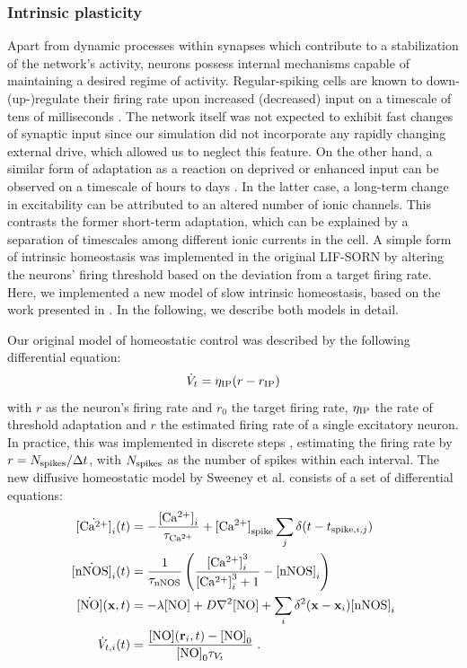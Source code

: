 \documentclass[10pt,letterpaper]{article}
\begin{document}
\subsubsection*{Intrinsic plasticity}
Apart from dynamic processes within synapses which contribute to a stabilization of the network's activity, neurons possess internal mechanisms capable of maintaining a desired regime of activity. Regular-spiking cells are known to down-(up-)regulate their firing rate upon increased (decreased) input on a timescale of tens of milliseconds \cite{Connors_Gutnick_Spike_Patterns,Benda_Herz_Spike_Frequ_Adaption}. The network itself was not expected to exhibit fast changes of synaptic input since our simulation did not incorporate any rapidly changing external drive, which allowed us to neglect this feature. On the other hand, a similar form of adaptation as a reaction on deprived or enhanced input can be observed on a timescale of hours to days \cite{Desai_IP}. In the latter case, a long-term change in excitability can be attributed to an altered number of ionic channels. This contrasts the former short-term adaptation, which can be explained by a separation of timescales among different ionic currents in the cell. A simple form of intrinsic homeostasis was implemented in the original LIF-SORN by altering the neurons' firing threshold based on the deviation from a target firing rate. Here, we implemented a new model of slow intrinsic homeostasis, based on the work presented in \cite{Sweeney_Paper}. In the following, we describe both models in detail.

Our original model of homeostatic control was described by the following differential equation:
\begin{equation}
\dot{V}_t = \eta_{\rm IP}(r-r_{\rm IP}) \label{can_hom_rate}
\end{equation}
with $r$ as the neuron's firing rate and $r_0$ the target firing rate, $\eta_{\rm IP}$ the rate of threshold adaptation and $r$ the estimated firing rate of a single excitatory neuron. In practice, this was implemented in discrete steps , estimating the firing rate by $r = N_{\rm spikes} / \Delta t$, with $N_{\rm spikes}$ as the number of spikes within each interval. The new diffusive homeostatic model by Sweeney et al. consists of a set of differential equations:   
\begin{align}
\dot{{\rm [Ca^{2+}]}}_i(t) &= -\frac{{\rm [Ca^{2+}]}_i}{\tau_{\rm Ca^{2+}}} + {\rm [Ca^{2+}]}_{\rm spike} \sum_{j} \delta(t-t_{\mathrm{spike},i,j}) \label{Ca_dyn}\\
\dot{{\rm [nNOS]}}_i(t) &= \frac{1}{\tau_{\rm nNOS}} \left(\frac{{\rm [Ca^{2+}]}_i^3}{{\rm [Ca^{2+}]}_i^3+1} - {\rm [nNOS]}_i \right) \label{nNOS_dyn}\\
\dot{{\rm [NO]}}(\mathbf{x},t)&=-\lambda {\rm [NO]} + D \nabla^2 {\rm [NO]} + \sum_{i} \delta^2(\mathbf{x}-\mathbf{x}_i) {\rm [nNOS]}_i \label{NO_dyn}\\
\dot{V}_{t,i}(t) &= \frac{{\rm [NO]}(\mathbf{r}_{i},t)-{\rm [NO]}_0}{{\rm [NO]}_0 \tau_{V_t}} \; . \label{Theta_dyn}
\end{align}
\end{document}
